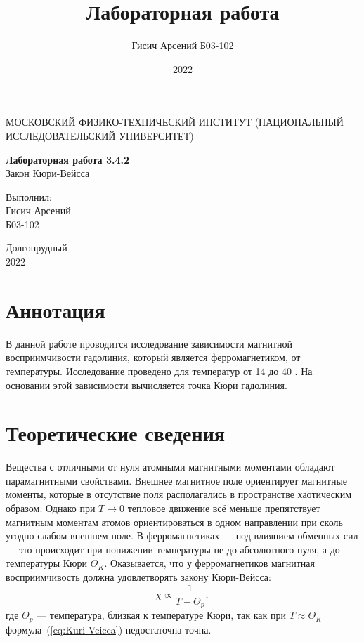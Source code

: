 \documentclass[a4paper, 12pt]{article}
\title{Лабораторная работа}
\author{Гисич Арсений Б03-102}
\date{2022}
\begin{document}
	\begin{center}
		{\large МОСКОВСКИЙ ФИЗИКО-ТЕХНИЧЕСКИЙ ИНСТИТУТ (НАЦИОНАЛЬНЫЙ ИССЛЕДОВАТЕЛЬСКИЙ УНИВЕРСИТЕТ)}
	\end{center}
	\vspace{5 cm}
	{\Large
		\begin{center}
			{\bf Лабораторная работа 3.4.2}\\[0.2 cm]
			Закон Кюри-Вейсса
		\end{center}
	}
	\vspace{4 cm}
	\begin{flushright}
		{\Large Выполнил: \\
			\vspace{0.2 cm}
			Гисич Арсений \\
			\vspace{0.2 cm}
			Б03-102 \\}
	\end{flushright}
	\vspace{9 cm}
	\begin{center}
		Долгопрудный\\[0.1 cm]
		2022
	\end{center}
\thispagestyle{empty}

\section{Аннотация}

В данной работе проводится исследование зависимости магнитной восприимчивости гадолиния, который является ферромагнетиком, от температуры. Исследование проведено для температур от 14 до 40 \textcelsius. На основании этой зависимости вычисляется точка Кюри гадолиния.

\section{Теоретические сведения}

Вещества с отличными от нуля атомными магнитными моментами обладают парамагнитными свойствами. Внешнее магнитное поле ориентирует магнитные моменты, которые в отсутствие поля располагались в пространстве хаотическим образом. Однако при $T \rightarrow 0$ тепловое движение всё меньше препятствует магнитным моментам атомов ориентироваться в одном направлении при сколь угодно слабом внешнем поле. В ферромагнетиках --- под влиянием обменных сил --- это происходит при понижении температуры не до абсолютного нуля, а до температуры Кюри $\Theta_K$. Оказывается, что у ферромагнетиков магнитная восприимчивость должна удовлетворять закону Кюри-Вейсса:
\begin{equation}
	\label{eq:Kuri-Veicca}
	\chi \propto \frac{1}{T-\Theta_p},
\end{equation}
где $\Theta_p$ --- температура, близкая к температуре Кюри, так как при $T \approx \Theta_K$ формула~(\ref{eq:Kuri-Veicca}) недостаточна точна.
\end{document}
